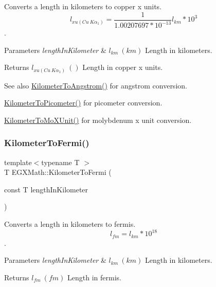 Converts a length in kilometers to copper x units. \[ l_{xu(Cu\ K\alpha_1)}= \frac{1}{1.00207697*10^{-13}} l_{km} * 10^{3}\]. 


\begin{DoxyParams}{Parameters}
{\em length\+In\+Kilometer} & $ l_{km}\ (km)$ Length in kilometers. \\
\hline
\end{DoxyParams}
\begin{DoxyReturn}{Returns}
$ l_{xu(Cu\ K\alpha_1)}\ ()$ Length in copper x units. 
\end{DoxyReturn}
\begin{DoxySeeAlso}{See also}
\mbox{\hyperlink{group___e_g_x_math-_conversions-_length_conversions-_s_i-_kilometer-_non-_s_i_ga415a412a1b03916d6071a206a3318035}{Kilometer\+To\+Angstrom()}} for angstrom conversion. 

\mbox{\hyperlink{group___e_g_x_math-_conversions-_length_conversions-_s_i-_kilometer-_s_i_ga73f6e033de3c41892f06cde1862f68d6}{Kilometer\+To\+Picometer()}} for picometer conversion. 

\mbox{\hyperlink{group___e_g_x_math-_conversions-_length_conversions-_s_i-_kilometer-_non-_s_i_ga547782594ebd0cc3e565f6d32f9528df}{Kilometer\+To\+Mo\+X\+Unit()}} for molybdenum x unit conversion. 
\end{DoxySeeAlso}
\mbox{\label{group___e_g_x_math-_conversions-_length_conversions-_s_i-_kilometer-_non-_s_i_ga9c38d019deb86a60173d5d2b65a1ef57}} 
\subsubsection{\texorpdfstring{Kilometer\+To\+Fermi()}{KilometerToFermi()}}
{\footnotesize\ttfamily template$<$typename T $>$ \\
T E\+G\+X\+Math\+::\+Kilometer\+To\+Fermi (\begin{DoxyParamCaption}\item[{const T}]{length\+In\+Kilometer }\end{DoxyParamCaption})}



Converts a length in kilometers to fermis. \[ l_{fm}=l_{km} * 10^{18} \]. 


\begin{DoxyParams}{Parameters}
{\em length\+In\+Kilometer} & $ l_{km}\ (km)$ Length in kilometers. \\
\hline
\end{DoxyParams}
\begin{DoxyReturn}{Returns}
$ l_{fm}\ (fm)$ Length in fermis. 
\end{DoxyReturn}
\mbox{\label{group___e_g_x_math-_conversions-_length_conversions-_s_i-_kilometer-_non-_s_i_gae662bafe0d1fc36276a336fd969307a0}} 
